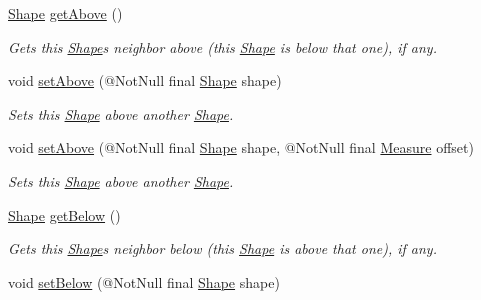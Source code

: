 \begin{DoxyCompactItemize}
\hyperlink{classcom_1_1aarrelaakso_1_1drawl_1_1_shape}{Shape} \hyperlink{classcom_1_1aarrelaakso_1_1drawl_1_1_shape_acebea2aa57031322323c9bf50ee447db}{get\+Above} ()
\begin{DoxyCompactList}\small\item\em Gets this \hyperlink{classcom_1_1aarrelaakso_1_1drawl_1_1_shape}{Shape}\textquotesingle{}s neighbor above (this \hyperlink{classcom_1_1aarrelaakso_1_1drawl_1_1_shape}{Shape} is below that one), if any. \end{DoxyCompactList}\item 
void \hyperlink{classcom_1_1aarrelaakso_1_1drawl_1_1_shape_a4deb22d64fef2115a0bc4802e8dba682}{set\+Above} (@Not\+Null final \hyperlink{classcom_1_1aarrelaakso_1_1drawl_1_1_shape}{Shape} shape)
\begin{DoxyCompactList}\small\item\em Sets this \hyperlink{classcom_1_1aarrelaakso_1_1drawl_1_1_shape}{Shape} above another \hyperlink{classcom_1_1aarrelaakso_1_1drawl_1_1_shape}{Shape}. \end{DoxyCompactList}\item 
void \hyperlink{classcom_1_1aarrelaakso_1_1drawl_1_1_shape_aad0b2fb173c0112b71b06cf90709acc3}{set\+Above} (@Not\+Null final \hyperlink{classcom_1_1aarrelaakso_1_1drawl_1_1_shape}{Shape} shape, @Not\+Null final \hyperlink{classcom_1_1aarrelaakso_1_1drawl_1_1_measure}{Measure} offset)
\begin{DoxyCompactList}\small\item\em Sets this \hyperlink{classcom_1_1aarrelaakso_1_1drawl_1_1_shape}{Shape} above another \hyperlink{classcom_1_1aarrelaakso_1_1drawl_1_1_shape}{Shape}. \end{DoxyCompactList}\item 
\hyperlink{classcom_1_1aarrelaakso_1_1drawl_1_1_shape}{Shape} \hyperlink{classcom_1_1aarrelaakso_1_1drawl_1_1_shape_a53de5ab609d879719cd3b372dfe8df58}{get\+Below} ()
\begin{DoxyCompactList}\small\item\em Gets this \hyperlink{classcom_1_1aarrelaakso_1_1drawl_1_1_shape}{Shape}\textquotesingle{}s neighbor below (this \hyperlink{classcom_1_1aarrelaakso_1_1drawl_1_1_shape}{Shape} is above that one), if any. \end{DoxyCompactList}\item 
void \hyperlink{classcom_1_1aarrelaakso_1_1drawl_1_1_shape_a4147526667449f5beb534d4404ba8f77}{set\+Below} (@Not\+Null final \hyperlink{classcom_1_1aarrelaakso_1_1drawl_1_1_shape}{Shape} shape)

\end{DoxyCompactItemize}
